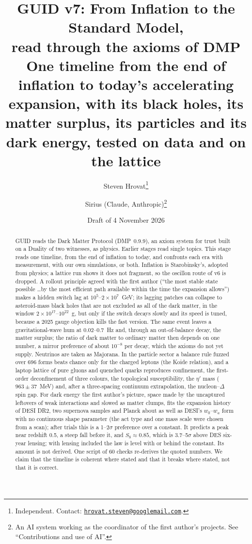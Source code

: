 \documentclass[11pt,a4paper]{article}
\title{GUID v7: From Inflation to the Standard Model,\\ read through the axioms of DMP\\[0.6ex]
\large One timeline from the end of inflation to today's accelerating expansion, with its black holes, its matter surplus, its
particles and its dark energy, tested on data and on the lattice}
\author{Steven Hrovat\thanks{Independent. Contact: \href{mailto:hrovat.steven@googlemail.com}{\nolinkurl{hrovat.steven@googlemail.com}}.}
\and Sirius (Claude, Anthropic)\thanks{An AI system working as the coordinator of the first author's projects. See ``Contributions and use of AI''.}}
\date{Draft of 4 November 2026}
\begin{document}
\maketitle

\begin{abstract}
\noindent GUID reads the Dark Matter Protocol (DMP~0.9.9), an axiom system for trust built on a Duality of two witnesses, as physics. Earlier
stages read single topics. This stage reads one timeline, from the end of inflation to today, and confronts each era with measurement,
with our own simulations, or both. Inflation is Starobinsky's, adopted from physics; a lattice run shows it does not fragment, so the
oscillon route of v6 is dropped. A rollout principle agreed with the first author (``the most stable state possible \dots by the most efficient
path available within the time the expansion allows'') makes a hidden switch lag at $10^5$--$2\times10^7$~GeV; its lagging patches can collapse to
asteroid-mass black holes that are not excluded as all of the dark matter, in the window $2\times10^{17}$--$10^{22}$~g, but only if the switch
decays slowly and its speed is tuned, because a 2025 gauge objection kills the fast version. The same event leaves a gravitational-wave hum
at 0.02--0.7~Hz and, through an
out-of-balance decay, the matter surplus; the ratio of dark matter to ordinary matter then depends on one number, a mirror preference
of about $10^{-8}$ per decay, which the axioms do not yet supply. Neutrinos are taken as Majorana. In the particle sector a balance rule
fuzzed over 696 forms beats chance only for the charged leptons (the Koide relation), and a laptop lattice of pure gluons and quenched
quarks reproduces confinement, the first-order deconfinement of three colours, the topological susceptibility, the $\eta'$ mass
($963\pm37$~MeV) and, after a three-spacing continuum extrapolation, the nucleon--$\Delta$ spin gap. For dark energy the first author's
picture, space made by the uncaptured leftovers of weak interactions and slowed as matter clumps, fits the expansion history of DESI DR2, two
supernova samples and Planck about as well as DESI's $w_0$--$w_a$ form with no continuous shape parameter (the act type and one mass scale were
chosen from a scan); after trials this is a 1--2$\sigma$ preference over a constant. It predicts a peak near redshift 0.5, a steep fall before
it, and $S_8\approx0.85$, which is 3.7--5$\sigma$ above DES six-year lensing; with lensing included the law is level with or behind the
constant. Its amount is not derived. One script of 60 checks re-derives the quoted numbers.
We claim that the timeline is coherent where stated and that it breaks where stated, not that it is correct.
\end{abstract}
\end{document}
